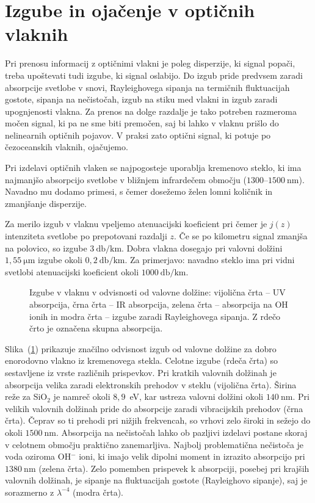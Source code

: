 \section{Izgube in ojačenje v optičnih vlaknih}
Pri prenosu informacij z optičnimi vlakni je poleg disperzije, ki signal popači,
treba upoštevati tudi izgube, ki signal oslabijo. 
Do izgub pride predvsem zaradi absorpcije svetlobe v snovi,
Rayleighovega sipanja na termičnih fluktuacijah gostote, sipanja na nečistočah, 
izgub na stiku med vlakni in izgub zaradi upognjenosti vlakna. Za prenos na dolge
razdalje je tako potreben razmeroma močen signal, ki pa ne sme biti premočen,
saj bi lahko v vlaknu prišlo do nelinearnih optičnih pojavov. V praksi zato 
optični signal, ki potuje po čezoceanskih vlaknih, ojačujemo. 

Pri izdelavi optičnih vlaken se najpogosteje uporablja kremenovo steklo, ki 
ima najmanjšo absorpcijo svetlobe v bližnjem infrardečem območju 
($1300$--$1500~\si{\nano\meter}$).
Navadno mu dodamo primesi, s čemer dosežemo želen lomni količnik in 
zmanjšanje disperzije. 

Za merilo izgub v vlaknu vpeljemo atenuacijski 
koeficient
pri čemer je $j(z)$ intenziteta svetlobe po prepotovani razdalji $z$. Če se po 
kilometru signal zmanjša na polovico, so izgube $3~\si{\decibel/\kilo\meter}$.
Dobra vlakna dosegajo pri valovni dolžini $1,55~\si{\micro\meter}$ izgube okoli 
$0,2~\si{\decibel/\kilo\meter}$. 
Za primerjavo: navadno steklo ima pri vidni svetlobi atenuacijski koeficient okoli 
$1000~\si{\decibel/\kilo\meter}$.

\begin{figure}[h]
\centering
\def\svgwidth{90truemm} 
 
\caption{Izgube v vlaknu v odvisnosti od valovne dolžine: vijolična črta -- UV absorpcija, 
črna črta -- IR absorpcija, zelena črta -- absorpcija na OH ionih in modra črta --
izgube zaradi Rayleighovega sipanja. Z rdečo črto je označena skupna absorpcija.}
\label{FibAbs}
\end{figure}
Slika~(\ref{FibAbs}) prikazuje značilno odvisnost izgub od valovne dolžine 
za dobro enorodovno vlakno iz kremenovega stekla. Celotne izgube (rdeča črta)
so sestavljene iz vrste različnih prispevkov. 
Pri kratkih valovnih dolžinah je absorpcija velika zaradi elektronskih prehodov
v steklu (vijolična črta). Širina reže za SiO$_2$ je namreč okoli $8,9$~eV, 
kar ustreza valovni dolžini
okoli $140~\si{\nano\meter}$. Pri velikih valovnih dolžinah pride do absorpcije zaradi
vibracijskih prehodov (črna črta). Čeprav so ti prehodi pri nižjih frekvencah, 
so vrhovi zelo široki in sežejo do okoli $1500~\si{\nano\meter}$. 
Absorpcija na nečistočah lahko ob pazljivi izdelavi postane skoraj v celotnem 
območju praktično zanemarljiva. 
Najbolj problematična nečistoča je voda oziroma OH$^{-}$ ioni, ki imajo velik dipolni
moment in izrazito absorpcijo pri $1380~\si{\nano\meter}$ (zelena črta). Zelo pomemben prispevek k 
absorpciji, posebej pri krajših valovnih dolžinah, je sipanje na fluktuacijah 
gostote (Rayleighovo sipanje), saj je sorazmerno z $\lambda^{-4}$ (modra črta). 

